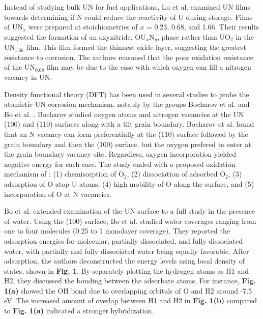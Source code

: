 \documentclass[11pt]{article}
\begin{document}
\begin{multicols}{2}
 Instead of studying bulk UN for fuel applications, Lu et al. \cite{Lu2016} examined UN films towards determining if N could reduce the reactivity of U during storage.  Films of UN$_{x}$ were prepared at stoichiometries of $x$ = 0.23, 0.68, and 1.66. Their results suggested the formation of an oxynitride, OU$_{x}$N$_{y}$, phase rather than UO$_{2}$ in the UN$_{1.66}$ film. This film formed the thinnest oxide layer, suggesting the greatest resistance to corrosion. The authors reasoned that the poor oxidation resistance of the UN$_{0.68}$ film may be due to the ease with which oxygen can fill a nitrogen vacancy in UN.
\par 
Density functional theory (DFT) has been used in several studies to probe the atomistic UN corrosion mechanism, notably by the groups Bocharov et al. \cite{Bocharov2013} and Bo et al. \cite{Bo2016}. Bocharov studied oxygen atoms and nitrogen vacancies at the UN (100) and (110) surfaces along with a tilt grain boundary. Bocharov et al. found that an N vacancy can form preferentially at the (110) surface followed by the grain boundary and then the (100) surface, but the oxygen prefered to enter at the grain boundary vacancy site. Regardless, oxygen incorporation yielded negative energy for each case. The study ended with a proposed oxidation mechanism of \cite{Bocharov2013}: 
	(1) chemisorption of O$_{2}$,
	(2) dissociation of adsorbed O$_{2}$,
	(3) adsorption of O atop U atoms,
	(4) high mobility of O along the surface, and
	(5) incorporation of O at N vacancies.
\par 
Bo et al. \cite{Bo2016} extended examination of the UN surface to a full study in the presence of water. Using the (100) surface, Bo et al. studied water coverages ranging from one to four molecules (0.25 to 1 monolayer coverage). They reported the adsorption energies for molecular, partially dissociated, and fully dissociated water, with partially and fully dissociated water being equally favorable. After adsorption, the authors deconstructed the energy levels using local density of states, shown in \textbf{Fig. 1}. By separately plotting the hydrogen atoms as H1 and H2, they discussed the bonding between the adsorbate atoms. For instance, \textbf{Fig. 1(a)} showed the OH bond due to overlapping orbitals of O and H2 around -7.5 eV. The increased amount of overlap between H1 and H2 in \textbf{Fig. 1(b)} compared to \textbf{Fig. 1(a)} indicated a stronger hybridization.
\begin{center}

\end{center}
\end{multicols}
\end{document}
